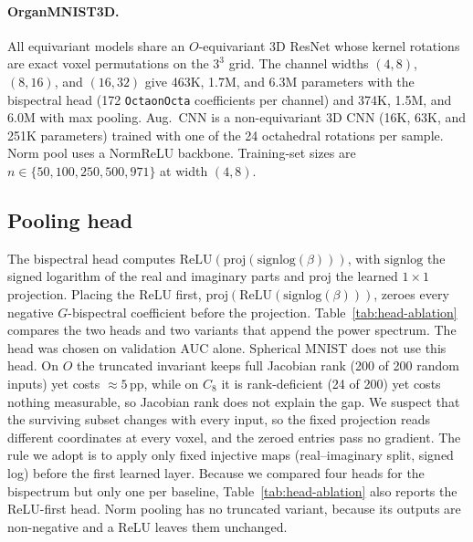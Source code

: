 \documentclass{article}
\theoremstyle{definition}
\theoremstyle{remark}
\theoremstyle{definition}
\begin{document}
\paragraph{OrganMNIST3D.}
All equivariant models share an $O$-equivariant 3D ResNet whose kernel rotations are exact
voxel permutations on the $3^3$ grid. The channel widths $(4, 8)$, $(8, 16)$, and $(16, 32)$ give 463K, 1.7M, and 6.3M parameters with the bispectral head (172 \texttt{OctaonOcta}
coefficients per channel) and 374K, 1.5M, and 6.0M with max pooling. Aug.\ CNN is a
non-equivariant 3D CNN (16K, 63K, and 251K parameters) trained with one of the 24 octahedral rotations per sample. Norm pool
uses a NormReLU backbone. Training-set sizes are $n \in \{50, 100, 250, 500, 971\}$ at
width $(4, 8)$.

\subsection{Pooling head}
\label{app:pooling-head}

The bispectral head computes $\mathrm{ReLU}(\mathrm{proj}(\mathrm{signlog}(\beta)))$,
with $\mathrm{signlog}$ the signed logarithm of the real and imaginary parts and $\mathrm{proj}$
the learned $1{\times}1$ projection. Placing the ReLU first,
$\mathrm{proj}(\mathrm{ReLU}(\mathrm{signlog}(\beta)))$, zeroes every negative $G$-bispectral
coefficient before the projection. Table~\ref{tab:head-ablation} compares the two heads and two
variants that append the power spectrum. The head was chosen on validation AUC alone.
Spherical MNIST does not use this head.
On $O$ the truncated invariant keeps full Jacobian rank
(200 of 200 random inputs) yet costs ${\approx}5$\,pp, while on $C_8$ it is rank-deficient
(24 of 200) yet costs nothing measurable, so Jacobian rank does not explain the gap. We suspect that the
surviving subset changes with every input, so the fixed projection reads different coordinates
at every voxel, and the zeroed entries pass no gradient. The rule we adopt is to apply only fixed
injective maps (real--imaginary split, signed log) before the first learned layer. Because we compared four heads for the bispectrum but only one per baseline,
Table~\ref{tab:head-ablation} also reports the ReLU-first head. Norm pooling has no truncated variant, because its outputs are
non-negative and a ReLU leaves them unchanged.
\end{document}
